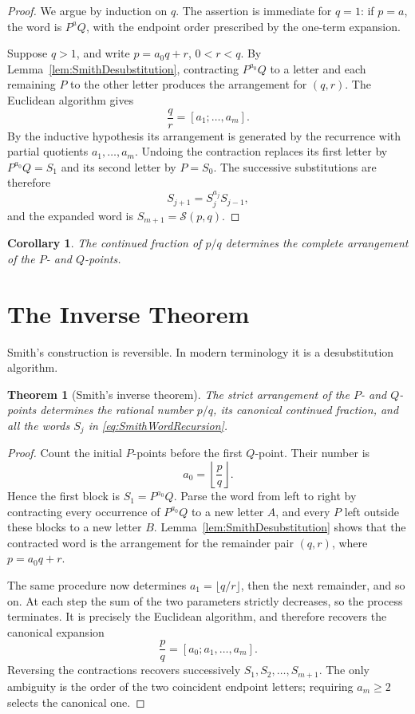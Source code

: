 \documentclass{book}
\newtheorem{theorem}[definition]{Theorem}
\newtheorem{corollary}[definition]{Corollary}
\begin{document}
\begin{proof}
  We argue by induction on \(q\). The assertion is immediate for \(q=1\):
  if \(p=a\), the word is \(P^aQ\), with the endpoint order prescribed by
  the one-term expansion.

  Suppose \(q>1\), and write \(p=a_0q+r\), \(0<r<q\). By
  Lemma~\ref{lem:SmithDesubstitution}, contracting \(P^{a_0}Q\) to a letter
  and each remaining \(P\) to the other letter produces the arrangement for
  \((q,r)\). The Euclidean algorithm gives
  \[
    \frac qr=[a_1;\ldots,a_m].
  \]
  By the inductive hypothesis its arrangement is generated by the recurrence
  with partial quotients \(a_1,\ldots,a_m\). Undoing the contraction replaces
  its first letter by \(P^{a_0}Q=S_1\) and its second letter by \(P=S_0\).
  The successive substitutions are therefore
  \[
    S_{j+1}=S_j^{a_j}S_{j-1},
  \]
  and the expanded word is \(S_{m+1}=\mathcal S(p,q)\).
\end{proof}

\begin{corollary}\label{cor:SmithOrderFromCF}
  The continued fraction of \(p/q\) determines the complete arrangement of
  the \(P\)- and \(Q\)-points.
\end{corollary}

\section{The Inverse Theorem}

Smith's construction is reversible. In modern terminology it is a
desubstitution algorithm.

\begin{theorem}[Smith's inverse theorem]\label{thm:SmithInverse}
  The strict arrangement of the \(P\)- and \(Q\)-points determines the
  rational number \(p/q\), its canonical continued fraction, and all the
  words \(S_j\) in \eqref{eq:SmithWordRecursion}.
\end{theorem}

\begin{proof}
  Count the initial \(P\)-points before the first \(Q\)-point. Their number
  is
  \[
    a_0=\left\lfloor\frac pq\right\rfloor.
  \]
  Hence the first block is \(S_1=P^{a_0}Q\). Parse the word from left to
  right by contracting every occurrence of \(P^{a_0}Q\) to a new letter
  \(A\), and every \(P\) left outside these blocks to a new letter \(B\).
  Lemma~\ref{lem:SmithDesubstitution} shows that the contracted word is the
  arrangement for the remainder pair \((q,r)\), where
  \(p=a_0q+r\).

  The same procedure now determines
  \(a_1=\lfloor q/r\rfloor\), then the next remainder, and so on. At each
  step the sum of the two parameters strictly decreases, so the process
  terminates. It is precisely the Euclidean algorithm, and therefore
  recovers the canonical expansion
  \[
    \frac pq=[a_0;a_1,\ldots,a_m].
  \]
  Reversing the contractions recovers successively
  \(S_1,S_2,\ldots,S_{m+1}\). The only ambiguity is the order of the two
  coincident endpoint letters; requiring \(a_m\geq2\) selects the canonical
  one.
\end{proof}
\end{document}
